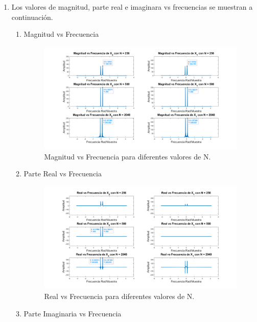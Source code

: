 \documentclass[letterpaper,onecolumn,10pt,journal,final]{IEEEtran}
\begin{document}
\begin{enumerate}[1)]
    \item %
Los valores de magnitud, parte real e imaginara vs frecuencias se muestran a continuación.
\begin{enumerate}
    \item Magnitud vs Frecuencia
\begin{figure}[H]
\centering
\includegraphics[width=1 \linewidth]{Figuras/I3)a.png}
\caption{Magnitud vs Frecuencia para diferentes valores de N.}
\label{fig:I3)a}
\end{figure}
    
    \item Parte Real vs Frecuencia
    
\begin{figure}[H]
\centering
\includegraphics[width=1 \linewidth]{Figuras/I3)b.png}
\caption{Real vs Frecuencia para diferentes valores de N.}
\label{fig:I3)b}
\end{figure}

    \item Parte Imaginaria vs Frecuencia
    

\end{enumerate}
\end{enumerate}
\end{document}
